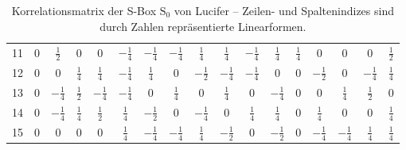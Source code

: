 \begin{refsegment}
\begin{table}
\begin{center}
\begin{tabular}{|c|cccccccccccccccc|}
  11 & 0 &$\frac{1}{2}$& 0 & 0 & $-\frac{1}{4}$ & $-\frac{1}{4}$ & $-\frac{1}{4}$ &$\frac{1}{4}$&$\frac{1}{4}$& $-\frac{1}{4}$ &$\frac{1}{4}$&$\frac{1}{4}$& 0 & 0 & 0 &$\frac{1}{2}$\\
  12 & 0 & 0 &$\frac{1}{4}$&$\frac{1}{4}$& $-\frac{1}{4}$ &$\frac{1}{4}$& 0 &$-\frac{1}{2}$& $-\frac{1}{4}$ & $-\frac{1}{4}$ & 0 & 0 &$-\frac{1}{2}$& 0 & $-\frac{1}{4}$ &$\frac{1}{4}$\\
  13 & 0 & $-\frac{1}{4}$ &$\frac{1}{2}$& $-\frac{1}{4}$ & $-\frac{1}{4}$ & 0 &$\frac{1}{4}$& 0 &$\frac{1}{4}$& 0 & $-\frac{1}{4}$ & 0 & 0 &$\frac{1}{4}$&$\frac{1}{2}$& 0 \\
  14 & 0 & $-\frac{1}{4}$ &$\frac{1}{4}$&$\frac{1}{2}$&$\frac{1}{4}$&$-\frac{1}{2}$& 0 & $-\frac{1}{4}$ & 0 &$\frac{1}{4}$&$\frac{1}{4}$& 0 &$\frac{1}{4}$& 0 & 0 &$\frac{1}{4}$\\
  15 & 0 & 0 & 0 & 0 &$\frac{1}{4}$& $-\frac{1}{4}$ & $-\frac{1}{4}$ &$\frac{1}{4}$&$-\frac{1}{2}$& 0 &$-\frac{1}{2}$& 0 & $-\frac{1}{4}$ & $-\frac{1}{4}$ &$\frac{1}{4}$&$\frac{1}{4}$\\ \hline
\end{tabular}
\end{center}\caption{Korrelationsmatrix der S-Box $\mathrm{S}_0$ von {\sc Lucifer} --
   Zeilen- und Spaltenindizes sind durch Zahlen repräsentierte Linearformen.}\label{tab-bool-corr}
\end{table}


\end{refsegment}
